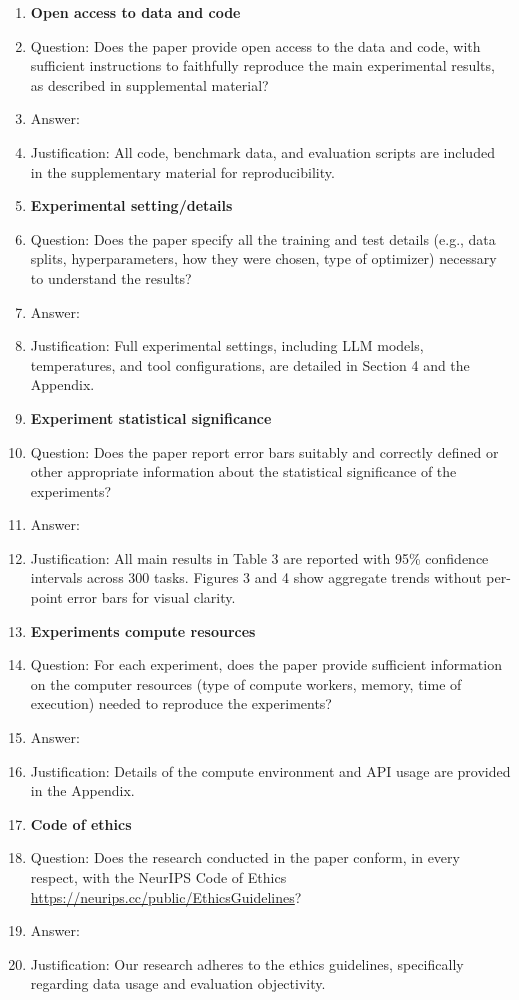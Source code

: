\begin{enumerate}
\item {\bf Open access to data and code}
    \item[] Question: Does the paper provide open access to the data and code, with sufficient instructions to faithfully reproduce the main experimental results, as described in supplemental material?
    \item[] Answer: \answerYes{} 
    \item[] Justification: All code, benchmark data, and evaluation scripts are included in the supplementary material for reproducibility.


\item {\bf Experimental setting/details}
    \item[] Question: Does the paper specify all the training and test details (e.g., data splits, hyperparameters, how they were chosen, type of optimizer) necessary to understand the results?
    \item[] Answer: \answerYes{} 
    \item[] Justification: Full experimental settings, including LLM models, temperatures, and tool configurations, are detailed in Section 4 and the Appendix.

\item {\bf Experiment statistical significance}
    \item[] Question: Does the paper report error bars suitably and correctly defined or other appropriate information about the statistical significance of the experiments?
    \item[] Answer: \answerYes{} 
    \item[] Justification: All main results in Table 3 are reported with 95\% confidence intervals across 300 tasks. Figures 3 and 4 show aggregate trends without per-point error bars for visual clarity.

\item {\bf Experiments compute resources}
    \item[] Question: For each experiment, does the paper provide sufficient information on the computer resources (type of compute workers, memory, time of execution) needed to reproduce the experiments?
    \item[] Answer: \answerYes{} 
    \item[] Justification: Details of the compute environment and API usage are provided in the Appendix.
    
\item {\bf Code of ethics}
    \item[] Question: Does the research conducted in the paper conform, in every respect, with the NeurIPS Code of Ethics \url{https://neurips.cc/public/EthicsGuidelines}?
    \item[] Answer: \answerYes{} 
    \item[] Justification: Our research adheres to the ethics guidelines, specifically regarding data usage and evaluation objectivity.



\end{enumerate}
